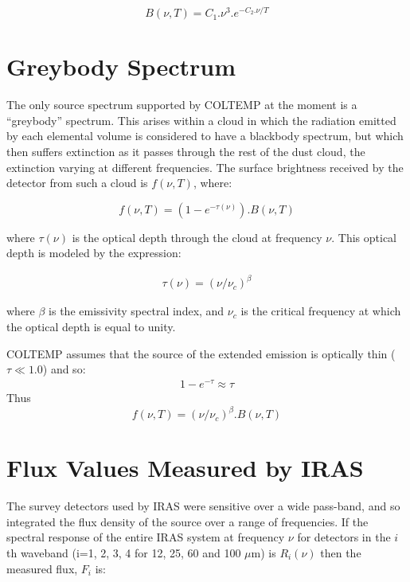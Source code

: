 \begin{equation}
B( \nu, T ) = C_{1}.\nu^{3}.e^{-C_{2}.\nu/T}
\end{equation}

\section{Greybody Spectrum}
The only source spectrum supported by {\small COLTEMP} at the moment is a
``greybody'' spectrum. This arises within a cloud in which the radiation emitted
by each elemental volume is considered to have a blackbody spectrum, but which
then suffers extinction as it passes through the rest of the dust cloud, the
extinction varying at different frequencies. The surface brightness received by
the detector from such a cloud is $f( \nu, T )$, where: 

\begin{equation}
\label{EQ:FD}
f( \nu, T ) = (1-e^{-\tau(\nu)}).B( \nu, T )
\end{equation}

where $\tau(\nu)$ is the optical depth through the cloud at frequency $\nu$.
This optical depth is modeled by the expression:

\begin{eqnarray*}
\tau(\nu) = (\nu/\nu_{c})^{\beta}
\end{eqnarray*}

where $\beta$ is the emissivity spectral index, and $\nu_{c}$ is the critical 
frequency at which the optical depth is equal to unity. 

{\small COLTEMP} assumes that the source of the extended emission is optically 
thin ($\tau \ll 1.0$) and so:
\begin{eqnarray*}
1-e^{-\tau} \approx \tau
\end{eqnarray*}
Thus 
\begin{equation}
f( \nu, T ) = (\nu/\nu_{c})^{\beta}.B( \nu, T )
\end{equation}

\section{Flux Values Measured by IRAS}
The survey detectors used by {\small IRAS} were sensitive over a wide pass-band,
and so integrated the flux density of the source over a range of frequencies. If
the spectral response of the entire {\small IRAS} system at frequency $\nu$ for 
detectors in the $i$th waveband (i=1, 2, 3, 4 for 12, 25, 60 and 100 $\mu$m) is 
$R_{i}(\nu)$ then the measured flux, $F_{i}$ is:


